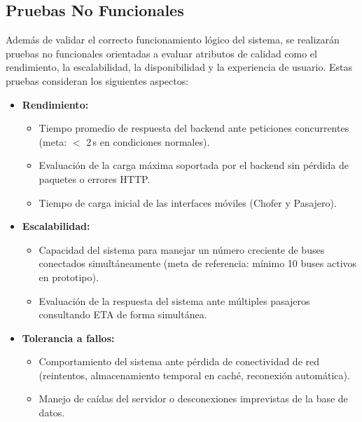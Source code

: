 \documentclass[12pt]{article}
\begin{document}
\subsection*{Pruebas No Funcionales}

Además de validar el correcto funcionamiento lógico del sistema, se realizarán pruebas no funcionales orientadas a evaluar atributos de calidad como el rendimiento, la escalabilidad, la disponibilidad y la experiencia de usuario. Estas pruebas consideran los siguientes aspectos:

\begin{itemize}
    \item \textbf{Rendimiento:}
    \begin{itemize}
        \item Tiempo promedio de respuesta del backend ante peticiones concurrentes (meta: $<$ 2\,s en condiciones normales).
        \item Evaluación de la carga máxima soportada por el backend sin pérdida de paquetes o errores HTTP.
        \item Tiempo de carga inicial de las interfaces móviles (Chofer y Pasajero).
    \end{itemize}

    \item \textbf{Escalabilidad:}
    \begin{itemize}
        \item Capacidad del sistema para manejar un número creciente de buses conectados simultáneamente (meta de referencia: mínimo 10 buses activos en prototipo).
        \item Evaluación de la respuesta del sistema ante múltiples pasajeros consultando ETA de forma simultánea.
    \end{itemize}

    \item \textbf{Tolerancia a fallos:}
    \begin{itemize}
        \item Comportamiento del sistema ante pérdida de conectividad de red (reintentos, almacenamiento temporal en caché, reconexión automática).
        \item Manejo de caídas del servidor o desconexiones imprevistas de la base de datos.
    \end{itemize}


\end{itemize}
\end{document}
